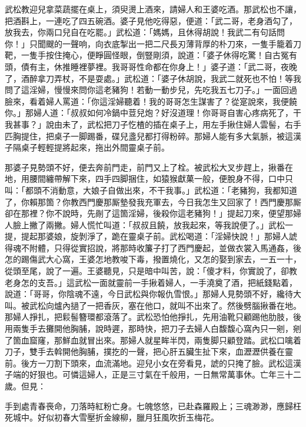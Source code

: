 武松教迎兒拿菜蔬擺在桌上，須臾燙上酒來，請婦人和王婆吃酒。那武松也不讓，把酒斟上，一連吃了四五碗酒。婆子見他吃得惡，便道：「武二哥，老身酒勾了，放我去，你兩口兒自在吃罷。」武松道：「媽媽，且休得胡說！我武二有句話問你！」只聞颼的一聲响，向衣底掣出一把二尺長刃薄背厚的朴刀來，一隻手籠着刀靶，一隻手按住掩心，便睜圓怪眼，倒豎剛須，說道：「婆子休得吃驚！自古冤有頭，債有主，休推睡裡夢裡。我哥哥性命都在你身上！」婆子道：「武二哥，夜晚了，酒醉拿刀弄杖，不是耍處。」武松道：「婆子休胡說，我武二就死也不怕！等我問了這淫婦，慢慢來問你這老豬狗！若動一動步兒，先吃我五七刀子。」一面回過臉來，看着婦人罵道：「你這淫婦聽着！我的哥哥怎生謀害了？從寔說來，我便饒你。」那婦人道：「叔叔如何冷鍋中荳兒炮？好沒道理！你哥哥自害心疼病死了，干我甚事？」說由未了，武松把刀子忔楂的插在桌子上，用左手揪住婦人雲髻，右手匹胸提住，把桌子一脚踢番，碟兒盞兒都打得粉碎。那婦人能有多大氣脈，被這漢子隔桌子輕輕提將起來，拖出外間靈桌子前。

那婆子見勢頭不好，便去奔前門走，前門又上了栓。被武松大叉步趕上，揪番在地，用腰間纏帶解下來，四手四脚捆住，如猿猴獻菓一般，便脫身不得，口中只叫：「都頭不消動意，大娘子自做出來，不干我事。」武松道：「老豬狗，我都知道了，你賴那箇？你教西門慶那厮墊發我充軍去，今日我怎生又回家了！西門慶那厮卻在那裡？你不說時，先剮了這箇淫婦，後殺你這老豬狗！」提起刀來，便望那婦人臉上撇了兩撇。婦人慌忙叫道：「叔叔且饒，放我起來，等我說便了。」武松一提，提起那婆娘，旋剝淨了，跪在靈桌子前。武松喝道：「淫婦快說！」那婦人諕得魂不附體，只得從實招說，將那時收簾子打了西門慶起，並做衣裳入馬通姦，後怎的踢傷武大心窩，王婆怎地教唆下毒，撥置燒化，又怎的娶到家去，一五一十，從頭至尾，說了一遍。{}王婆聽見，只是暗中叫苦，說：「傻才料，你實說了，卻教老身怎的支吾。」{}這武松一面就靈前一手揪着婦人，一手澆奠了酒，把紙錢點着，說道：「哥哥，你陰魂不遠，今日武松與你報仇雪恨。」那婦人見勢頭不好，纔待大叫。被武松向爐內撾了一把香灰，塞在他口，就叫不出來了。然後劈腦揪番在地。那婦人掙扎，把鬏髻簪環都滾落了。{}武松恐怕他掙扎，先用油靴只顧踢他肋肢，後用兩隻手去攤開他胸脯，說時遲，那時快，把刀子去婦人白馥馥心窩內只一剜，剜了箇血窟窿，那鮮血就冒出來。那婦人就星眸半閃，兩隻脚只顧登踏。武松口噙着刀子，雙手去斡開他胸脯，撲扢的一聲，把心肝五臟生扯下來，血瀝瀝供養在靈前。後方一刀割下頭來，血流滿地。{}迎兒小女在旁看見，諕的只掩了臉。武松這漢子端的好狠也。可憐這婦人，正是三寸氣在千般用，一日無常萬事休。亡年三十二歲。但見：

\begin{myquote}
手到處青春䘮命，刀落時紅粉亡身。七魄悠悠，已赴森羅殿上；三魂渺渺，應歸枉死城中。好似初春大雪壓折金線柳，臘月狂風吹折玉梅花。
\end{myquote}

